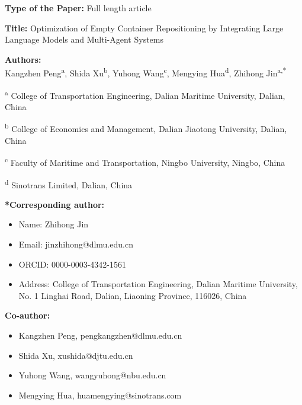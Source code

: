 \documentclass[12pt]{article}
\begin{document}

\noindent\textbf{Type of the Paper:} Full length article
\vspace{1.5em}

\noindent\textbf{Title:} 
Optimization of Empty Container Repositioning by Integrating Large Language Models and Multi-Agent Systems
\vspace{1em}


\vspace{1.5em}

\noindent\textbf{Authors:}
\\[0.5em]
Kangzhen Peng\textsuperscript{a}, Shida Xu\textsuperscript{b}, Yuhong Wang\textsuperscript{c}, Mengying Hua\textsuperscript{d}, Zhihong Jin\textsuperscript{a,*}

\vspace{1em}

\noindent\textsuperscript{a} College of Transportation Engineering, Dalian Maritime University, Dalian, China

\noindent\textsuperscript{b} College of Economics and Management, Dalian Jiaotong University, Dalian, China

\noindent\textsuperscript{c} Faculty of Maritime and Transportation, Ningbo University, Ningbo, China

\noindent\textsuperscript{d} Sinotrans Limited, Dalian, China

\vspace{1em}

\noindent\textbf{*Corresponding author:}
\begin{itemize}
    \item Name: Zhihong Jin
    \item Email: jinzhihong@dlmu.edu.cn
    \item ORCID: 0000-0003-4342-1561
    \item Address: College of Transportation Engineering, Dalian Maritime University, No. 1 Linghai Road, Dalian, Liaoning Province, 116026, China
\end{itemize}

\noindent\textbf{Co-author:}
\begin{itemize}
    \item Kangzhen Peng, pengkangzhen@dlmu.edu.cn
    \item Shida Xu, xushida@djtu.edu.cn
    \item Yuhong Wang, wangyuhong@nbu.edu.cn
    \item Mengying Hua, huamengying@sinotrans.com
\end{itemize}
\end{document}
